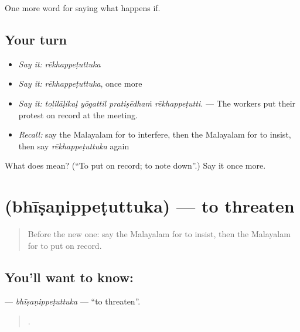 \begin{grammarlens}[title={What you've built}]
One more word for saying what happens if.
\end{grammarlens}

\subsection*{Your turn}
\begin{itemize}
\raggedright
  \item \emph{Say it:} \emph{rēkhappeṭuttuka}
  \item \emph{Say it:} \emph{rēkhappeṭuttuka}, once more
  \item \emph{Say it:} \emph{toḻilāḷikaḷ yōgattil pratiṣēdhaṁ rēkhappeṭutti.} — The workers put their protest on record at the meeting.
  \item \emph{Recall:} say the Malayalam for to interfere, then the Malayalam for to insist, then say \emph{rēkhappeṭuttuka} again
\end{itemize}

\begin{tcolorbox}[breakable,colback=teal!4,colframe=teal!35!black,title={Before you move on}]
What does  mean? (\textquotedblleft{}To put on record; to note down\textquotedblright{}.) Say it once more.
\end{tcolorbox}
\section[\texorpdfstring{\ml{ഭീഷണിപ്പെടുത്തുക} (bhīṣaṇippeṭuttuka)}{ഭീഷണിപ്പെടുത്തുക (bhīṣaṇippeṭuttuka)}]{ (bhīṣaṇippeṭuttuka) — to threaten}

\label{lesson:ML-C451-bhisanippetuttuka}



\begin{quote}
Before the new one: say the Malayalam for to insist, then the Malayalam for to put on record.
\end{quote}

\subsection*{You'll want to know: }
\textbf{} — \emph{bhīṣaṇippeṭuttuka} — \textquotedblleft{}to threaten\textquotedblright{}.

\begin{quote}
    .
\end{quote}

